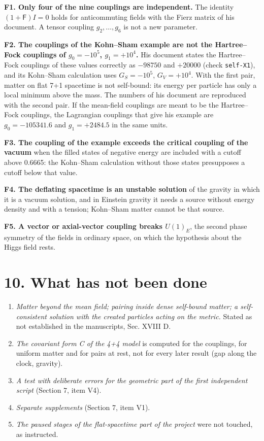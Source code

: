 \documentclass[
  10pt,
]{article}
\providecommand{\tightlist}{%
  \setlength{\itemsep}{0pt}\setlength{\parskip}{0pt}}
\begin{document}
\textbf{F1. Only four of the nine couplings are independent.} The
identity \((1+\mathsf F)I=0\) holds for anticommuting fields with the
Fierz matrix of his document. A tensor coupling \(g_2,\dots,g_6\) is not
a new parameter.

\textbf{F2. The couplings of the Kohn--Sham example are not the
Hartree--Fock couplings of \(g_0=-10^5\), \(g_1=+10^4\).} His document
states the Hartree--Fock couplings of these values correctly as
\(-98750\) and \(+20000\) (check \texttt{self-X1}), and its Kohn--Sham
calculation uses \(G_S=-10^5\), \(G_V=+10^4\). With the first pair,
matter on flat 7+1 spacetime is not self-bound: its energy per particle
has only a local minimum above the mass. The numbers of his document are
reproduced with the second pair. If the mean-field couplings are meant
to be the Hartree--Fock couplings, the Lagrangian couplings that give
his example are \(g_0=-105341.6\) and \(g_1=+2484.5\) in the same units.

\textbf{F3. The coupling of the example exceeds the critical coupling of
the vacuum} when the filled states of negative energy are included with
a cutoff above 0.6665: the Kohn--Sham calculation without those states
presupposes a cutoff below that value.

\textbf{F4. The deflating spacetime is an unstable solution} of the
gravity in which it is a vacuum solution, and in Einstein gravity it
needs a source without energy density and with a tension; Kohn--Sham
matter cannot be that source.

\textbf{F5. A vector or axial-vector coupling breaks \(U(1)_E\)}, the
second phase symmetry of the fields in ordinary space, on which the
hypothesis about the Higgs field rests.

\hypertarget{what-has-not-been-done}{%
\section{10. What has not been done}\label{what-has-not-been-done}}

\begin{enumerate}
\def\labelenumi{\arabic{enumi}.}
\tightlist
\item
  \emph{Matter beyond the mean field; pairing inside dense self-bound
  matter; a self-consistent solution with the created particles acting
  on the metric.} Stated as not established in the manuscripts, Sec.
  XVIII D.
\item
  \emph{The covariant form C of the 4+4 model} is computed for the
  couplings, for uniform matter and for pairs at rest, not for every
  later result (gap along the clock, gravity).
\item
  \emph{A test with deliberate errors for the geometric part of the
  first independent script} (Section 7, item V4).
\item
  \emph{Separate supplements} (Section 7, item V1).
\item
  \emph{The paused stages of the flat-spacetime part of the project}
  were not touched, as instructed.
\end{enumerate}
\end{document}
